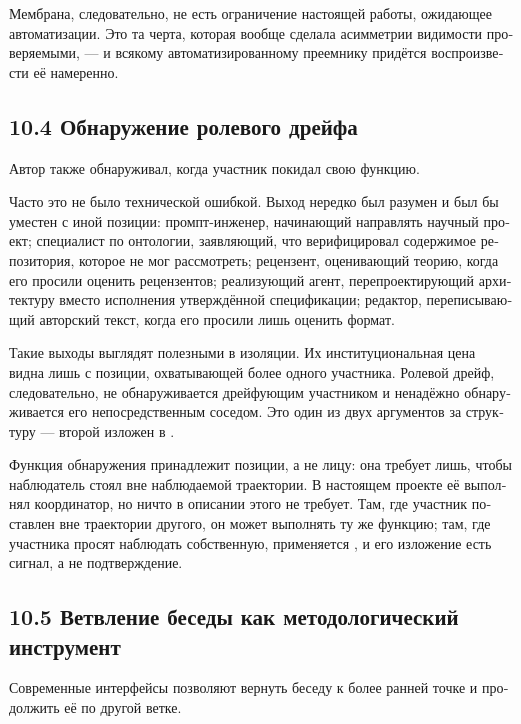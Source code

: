 \begin{russian}
Мембрана, следовательно, не есть ограничение настоящей работы, ожидающее автоматизации. Это та черта, которая вообще сделала асимметрии видимости проверяемыми, — и всякому автоматизированному преемнику придётся воспроизвести её намеренно.


\subsection*{10.4 Обнаружение ролевого дрейфа}
\label{sec:ru:10.4}

Автор также обнаруживал, когда участник покидал свою функцию.

Часто это не было технической ошибкой. Выход нередко был разумен и был бы уместен с иной позиции: промпт-инженер, начинающий направлять научный проект; специалист по онтологии, заявляющий, что верифицировал содержимое репозитория, которое не мог рассмотреть; рецензент, оценивающий теорию, когда его просили оценить рецензентов; реализующий агент, перепроектирующий архитектуру вместо исполнения утверждённой спецификации; редактор, переписывающий авторский текст, когда его просили лишь оценить формат.

Такие выходы выглядят полезными в изоляции. Их институциональная цена видна лишь с позиции, охватывающей более одного участника. Ролевой дрейф, следовательно, не обнаруживается дрейфующим участником и ненадёжно обнаруживается его непосредственным соседом. Это один из двух аргументов за структуру  — второй изложен в .

Функция обнаружения принадлежит позиции, а не лицу: она требует лишь, чтобы наблюдатель стоял вне наблюдаемой траектории. В настоящем проекте её выполнял координатор, но ничто в описании этого не требует. Там, где участник поставлен вне траектории другого, он может выполнять ту же функцию; там, где участника просят наблюдать собственную, применяется , и его изложение есть сигнал, а не подтверждение.


\subsection*{10.5 Ветвление беседы как методологический инструмент}
\label{sec:ru:10.5}

Современные интерфейсы позволяют вернуть беседу к более ранней точке и продолжить её по другой ветке.


\end{russian}
